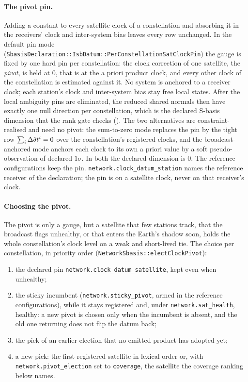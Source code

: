 \documentclass[main.tex]{subfiles}
\begin{document}
\paragraph{The pivot pin.}
Adding a constant to every satellite clock of a constellation and
absorbing it in the receivers' clock and inter-system bias leaves every
row unchanged. In the default pin mode
(\texttt{SbasisDeclaration::IsbDatum::PerConstellationSatClockPin}) the
gauge is fixed by one hard pin per constellation: the clock correction
of one satellite, the \emph{pivot}, is held at $0$, that is at the
a priori product clock, and every other clock of the constellation is
estimated against it. No system is anchored to a receiver clock; each
station's clock and inter-system bias stay free local states. After the
local ambiguity pins are eliminated, the reduced shared normals then have
exactly one null direction per constellation, which is the declared
S-basis dimension that the rank gate checks ().
The two alternatives are constraint-realised and need no pivot: the
sum-to-zero mode replaces the pin by the tight row $\sum_i
\Delta\delta t^i = 0$ over the constellation's registered clocks, and
the broadcast-anchored mode anchors each clock to its own a priori value
by a soft pseudo-observation of declared $1\sigma$. In both the declared
dimension is $0$. The reference configurations keep the pin.
\texttt{network.clock\_datum\_station} names the reference receiver of
the declaration; the pin is on a satellite clock, never on that
receiver's clock.

\paragraph{Choosing the pivot.}
The pivot is only a gauge, but a satellite that few stations track, that
the broadcast flags unhealthy, or that enters the Earth's shadow soon,
holds the whole constellation's clock level on a weak and short-lived
tie. The choice per constellation, in priority order
(\texttt{NetworkSbasis::electClockPivot}):
\begin{enumerate}[leftmargin=*, itemsep=1pt]
\item the declared pin \texttt{network.clock\_datum\_satellite}, kept
      even when unhealthy;
\item the sticky incumbent (\texttt{network.sticky\_pivot}, armed in the
      reference configurations), while it stays registered and, under
      \texttt{network.sat\_health}, healthy: a new pivot is chosen only
      when the incumbent is absent, and the old one returning does not
      flip the datum back;
\item the pick of an earlier election that no emitted product has
      adopted yet;
\item a new pick: the first registered satellite in lexical order or,
      with \texttt{network.pivot\_election} set to \texttt{coverage}, the
      satellite the coverage ranking below names.
\end{enumerate}
\end{document}
